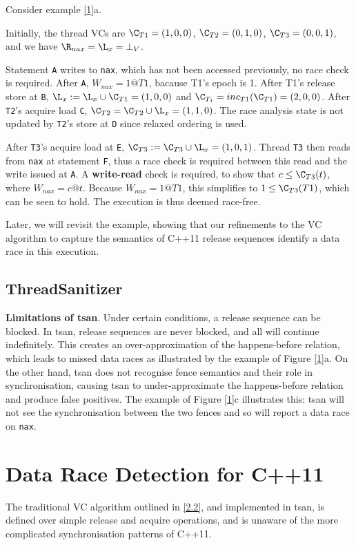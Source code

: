 \documentclass[11pt]{article}
\begin{document}
\begin{examplle}[]
Consider example \ref{1}a.

Initially, the thread VCs are \(\C_{T1}=(1,0,0)\), \(\C_{T2}=(0,1,0)\), \(\C_{T3}=(0,0,1)\), and we
have \(\R_{nax}=\L_x=\bot_V\).

Statement \texttt{A} writes to \texttt{nax}, which has not been accessed previously, no race check is required. After \texttt{A},
\(W_{nax}=1@T1\), bacause T1's epoch is 1. After T1's release store at \texttt{B},
\(\L_x:=\L_x\cup\C_{T1}=(1,0,0)\) and \(\C_{T_1}=inc_{T1}(\C_{T1})=(2,0,0)\). After \texttt{T2}'s acquire load
\texttt{C}, \(\C_{T2}=\C_{T2}\cup\L_x=(1,1,0)\). The race analysis state is not updated by \texttt{T2}'s store at \texttt{D}
since relaxed ordering is used.

After \texttt{T3}'s acquire load at \texttt{E}, \(\C_{T3}:=\C_{T3}\cup\L_x=(1,0,1)\). Thread \texttt{T3} then reads from \texttt{nax} at
statement \texttt{F}, thus a race check is required between this read and the write issued at \texttt{A}. A \textbf{write-read}
check is required, to show that \(c\le\C_{T3}(t)\), where \(W_{nax}=c@t\). Because \(W_{nax}=1@T1\),
this simplifies to \(1\le \C_{T3}(T1)\), which can be seen to hold. The execution is thus deemed
race-free.

Later, we will revisit the example, showing that our refinements to the VC algorithm to capture the
semantics of C++11 release sequences identify a data race in this execution.
\end{examplle}
\subsection{ThreadSanitizer}
\label{sec:orgc2c7cd9}
\textbf{Limitations of tsan}. Under certain conditions, a release sequence can be blocked. In tsan, release
sequences are never blocked, and all will continue indefinitely. This creates an over-approximation of
the happens-before relation, which leads to missed data races as illustrated by the example of Figure
\ref{1}a. On the other hand, tsan does not recognise fence semantics and their role in synchronisation,
causing tsan to under-approximate the happens-before relation and produce false positives. The example
of Figure \ref{1}c illustrates this: tsan will not see the synchronisation between the two fences and so
will report a data race on \texttt{nax}.
\section{Data Race Detection for C++11}
\label{sec:org37ded26}
The traditional VC algorithm outlined in \ref{2.2}, and implemented in tsan, is defined over simple
release and acquire operations, and is unaware of the more complicated synchronisation patterns of
C++11.
\end{document}
